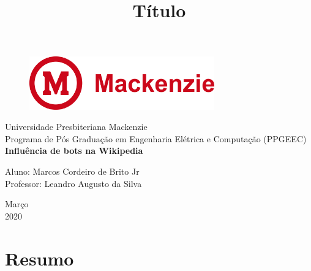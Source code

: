 \documentclass[a4paper, 12pt]{article}
\begin{document}

\begin{titlepage}
	\begin{center}
	
	\begin{figure}[!ht]
	\centering
	\includegraphics[width=8cm]{mackenzie-logo-2.png}
    \end{figure}

		\Huge{Universidade Presbiteriana Mackenzie}\\
		\large{Programa de Pós Graduação em Engenharia Elétrica e Computação (PPGEEC)}\\ 
		\vspace{15pt}
        \vspace{95pt}
        \textbf{\LARGE{Influência de bots na Wikipedia}}\\
		\title{{\large{Título}}}
		\vspace{3,5cm}
	\end{center}
	
	\begin{flushleft}
		\begin{tabbing}
			Aluno: Marcos Cordeiro de Brito Jr\\
			Professor: Leandro Augusto da Silva\\
	\end{tabbing}
 \end{flushleft}
	\vspace{1cm}
	
	\begin{center}
		\vspace{\fill}
			 Março\\
		 2020
			\end{center}
\end{titlepage}

\newpage
\tableofcontents
\thispagestyle{empty}

\newpage
{}
\section{Resumo}
\end{document}
